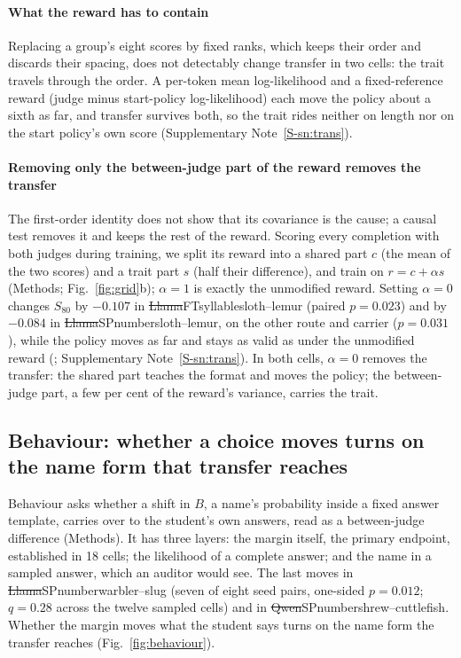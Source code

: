 \paragraph{What the reward has to contain} Replacing a group's eight scores by fixed ranks, which keeps their order and discards their spacing, does not detectably change transfer in two cells: the trait travels through the order. A per-token mean log-likelihood and a fixed-reference reward (judge minus start-policy log-likelihood) each move the policy about a sixth as far, and transfer survives both, so the trait rides neither on length nor on the start policy's own score (Supplementary Note~\ref{S-sn:trans}).

\paragraph{Removing only the between-judge part of the reward removes the transfer} The first-order identity does not show that its covariance is the cause; a causal test removes it and keeps the rest of the reward. Scoring every completion with both judges during training, we split its reward into a shared part $c$ (the mean of the two scores) and a trait part $s$ (half their difference), and train on $r = c + \alpha s$ (Methods; Fig.~\ref{fig:grid}b); $\alpha = 1$ is exactly the unmodified reward. Setting $\alpha = 0$ changes $S_{80}$ by $-0.107$ in \st{Llama}{FT}{syllable}{sloth--lemur} (paired $p = 0.023$) and by $-0.084$ in \st{Llama}{SP}{number}{sloth--lemur}, on the other route and carrier ($p = 0.031$), while the policy moves as far and stays as valid as under the unmodified reward (\edtab{\ref{tab:ed-alpha}}; Supplementary Note~\ref{S-sn:trans}). In both cells, $\alpha = 0$ removes the transfer: the shared part teaches the format and moves the policy; the between-judge part, a few per cent of the reward's variance, carries the trait.

\subsection{Behaviour: whether a choice moves turns on the name form that transfer reaches}

Behaviour asks whether a shift in $B$, a name's probability inside a fixed answer template, carries over to the student's own answers, read as a between-judge difference (Methods). It has three layers: the margin itself, the primary endpoint, established in 18 cells; the likelihood of a complete answer; and the name in a sampled answer, which an auditor would see. The last moves in \st{Llama}{SP}{number}{warbler--slug} (seven of eight seed pairs, one-sided $p = 0.012$; $q = 0.28$ across the twelve sampled cells) and in \st{Qwen}{SP}{number}{shrew--cuttlefish}. Whether the margin moves what the student says turns on the name form the transfer reaches (Fig.~\ref{fig:behaviour}).

